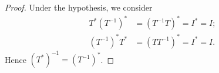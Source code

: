 \begin{Exercise}
	\begin{proof}
		Under the hypothesis, we consider
		\begin{align*}
		T^* (T^{-1})^* &= (T^{-1} T)^* = I^* = I; \\
		(T^{-1})^* T^* &= (T T^{-1})^* = I^* = I.
		\end{align*}
		Hence $(T^*)^{-1} = (T^{-1})^*$.
	\end{proof}
\end{Exercise}